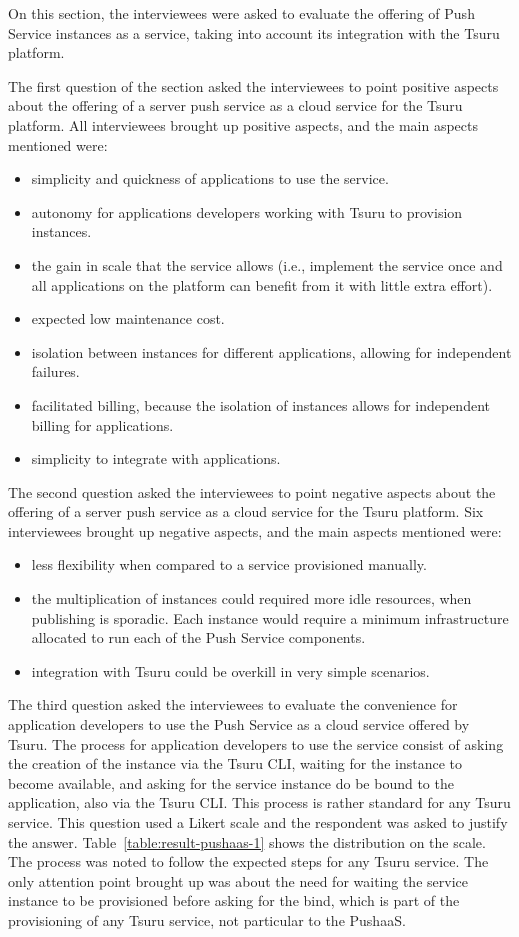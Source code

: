 On this section, the interviewees were asked to evaluate the offering of Push Service instances as a service, taking into account its integration with the Tsuru platform.

The first question of the section asked the interviewees to point positive aspects about the offering of a server push service as a cloud service for the Tsuru platform. All interviewees brought up positive aspects, and the main aspects mentioned were:
\begin{itemize}
    \item simplicity and quickness of applications to use the service.
    \item autonomy for applications developers working with Tsuru to provision instances.
    \item the gain in scale that the service allows (i.e., implement the service once and all applications on the platform can benefit from it with little extra effort).
    \item expected low maintenance cost.
    \item isolation between instances for different applications, allowing for independent failures.
    \item facilitated billing, because the isolation of instances allows for independent billing for applications.
    \item simplicity to integrate with applications.
\end{itemize}

The second question asked the interviewees to point negative aspects about the offering of a server push service as a cloud service for the Tsuru platform. Six interviewees brought up negative aspects, and the main aspects mentioned were:
\begin{itemize}
    \item less flexibility when compared to a service provisioned manually.
    \item the multiplication of instances could required more idle resources, when publishing is sporadic. Each instance would require a minimum infrastructure allocated to run each of the Push Service components.
    \item integration with Tsuru could be overkill in very simple scenarios.
\end{itemize}

The third question asked the interviewees to evaluate the convenience for application developers to use the Push Service as a cloud service offered by Tsuru. The process for application developers to use the service consist of asking the creation of the instance via the Tsuru CLI, waiting for the instance to become available, and asking for the service instance do be bound to the application, also via the Tsuru CLI. This process is rather standard for any Tsuru service. This question used a Likert scale and the respondent was asked to justify the answer. Table~\ref{table:result-pushaas-1} shows the distribution on the scale. The process was noted to follow the expected steps for any Tsuru service. The only attention point brought up was about the need for waiting the service instance to be provisioned before asking for the bind, which is part of the provisioning of any Tsuru service, not particular to the PushaaS.

